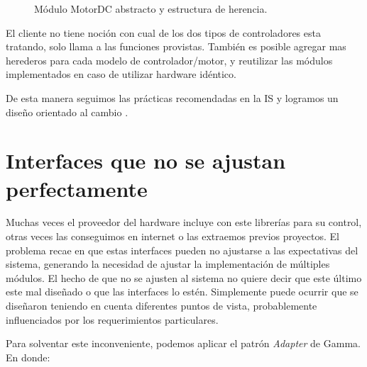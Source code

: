 \begin{figure}
\caption{Módulo MotorDC abstracto y estructura de herencia.}
\label{estructuraHerencia}
\begin{center}
\end{center}
\end{figure}

El cliente no tiene noción con cual de los dos tipos de controladores esta tratando, solo llama a las funciones provistas. También es posible agregar mas herederos para cada modelo de controlador/motor, y reutilizar las módulos implementados en caso de utilizar hardware idéntico. 

De esta manera seguimos las prácticas recomendadas en la IS \cite{ShawGarlan1996, ghezzi2003, bass2003, DBLP:books/daglib/0030743} y logramos un diseño orientado al cambio \cite{Gamma:1995:DPE:186897}.

\section{Interfaces que no se ajustan perfectamente}
Muchas veces el proveedor del hardware incluye con este librerías para su control, otras veces las conseguimos en internet o las extraemos previos proyectos. El problema recae en que estas interfaces pueden no ajustarse a las expectativas del sistema, generando la necesidad de ajustar la implementación de múltiples módulos. El hecho de que no se ajusten al sistema no quiere decir que este último este mal diseñado o que las interfaces lo estén. Simplemente puede ocurrir que se diseñaron teniendo en cuenta diferentes puntos de vista, probablemente influenciados por los requerimientos particulares.

Para solventar este inconveniente, podemos aplicar el patrón \textit{Adapter} de Gamma. En donde:

